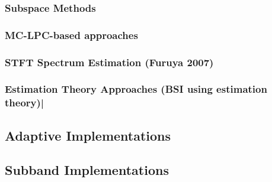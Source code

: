 \subsubsection{Subspace Methods}

\subsubsection{MC-LPC-based approaches} \label{section_dap}

\subsubsection{STFT Spectrum Estimation (Furuya 2007)}

\subsubsection{Estimation Theory Approaches (BSI using estimation theory)|}

\subsection{Adaptive Implementations}

\subsection{Subband Implementations}
